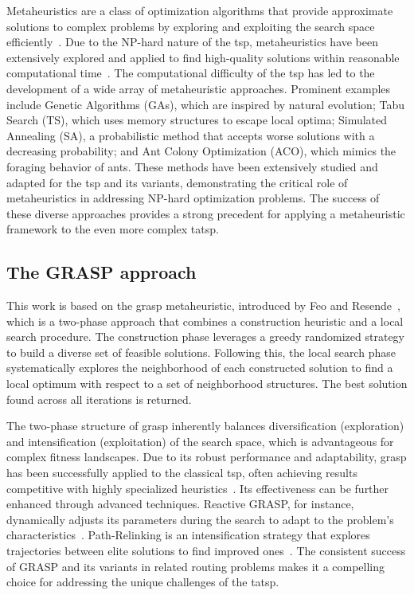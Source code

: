 \documentclass[twocolumn, switch]{article} %
\begin{document}
Metaheuristics are a class of optimization algorithms that provide approximate solutions to complex problems by exploring and exploiting the search space efficiently~\cite{Gendreau2010}. Due to the NP-hard nature of the \gls{tsp}, metaheuristics have been extensively explored and applied to find high-quality solutions within reasonable computational time~\cite{toaza2023}. 
The computational difficulty of the \gls{tsp} has led to the development of a wide array of metaheuristic approaches. Prominent examples include Genetic Algorithms (GAs), which are inspired by natural evolution; Tabu Search (TS), which uses memory structures to escape local optima; Simulated Annealing (SA), a probabilistic method that accepts worse solutions with a decreasing probability; and Ant Colony Optimization (ACO), which mimics the foraging behavior of ants. These methods have been extensively studied and adapted for the \gls{tsp} and its variants, demonstrating the critical role of metaheuristics in addressing NP-hard optimization problems. The success of these diverse approaches provides a strong precedent for applying a metaheuristic framework to the even more complex \gls{tatsp}.

\subsection{The GRASP approach}

This work is based on the \gls{grasp} metaheuristic, introduced by Feo and Resende~\cite{Feo1995}, which is a two-phase approach that combines a construction heuristic and a local search procedure.
The construction phase leverages a greedy randomized strategy to build a diverse set of feasible solutions. Following this, the local search phase systematically explores the neighborhood of each constructed solution to find a local optimum with respect to a set of neighborhood structures.
The best solution found across all iterations is returned.

The two-phase structure of \gls{grasp} inherently balances diversification (exploration) and intensification (exploitation) of the search space, which is advantageous for complex fitness landscapes.
Due to its robust performance and adaptability, \gls{grasp} has been successfully applied to the classical \gls{tsp}, often achieving results competitive with highly specialized heuristics~\cite{Oliveira2004}. Its effectiveness can be further enhanced through advanced techniques. Reactive GRASP, for instance, dynamically adjusts its parameters during the search to adapt to the problem's characteristics~\cite{Prais2000}. Path-Relinking is an intensification strategy that explores trajectories between elite solutions to find improved ones~\cite{Resende2019}. The consistent success of GRASP and its variants in related routing problems makes it a compelling choice for addressing the unique challenges of the \gls{tatsp}.
\end{document}
